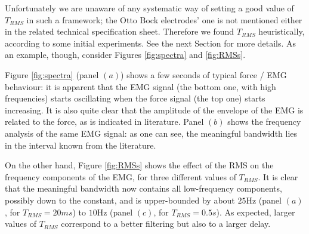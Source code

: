 \documentclass[10pt]{bmc_article}
\newenvironment{bmcformat}{\begin{raggedright}\baselineskip20pt\sloppy\setboolean{publ}{false}}{\end{raggedright}\baselineskip20pt\sloppy}
\begin{document}
\begin{bmcformat}


Unfortunately we are unaware of any systematic way of setting a good
value of $T_{RMS}$ in such a framework; the Otto Bock electrodes' one
is not mentioned either in the related technical specification
sheet. Therefore we found $T_{RMS}$ heuristically, according to some
initial experiments. See the next Section for more details. As an
example, though, consider Figures \ref{fig:spectra} and
\ref{fig:RMSs}.

Figure \ref{fig:spectra} (panel $(a)$) shows a few seconds of typical
force / EMG behaviour: it is apparent that the EMG signal (the bottom
one, with high frequencies) starts oscillating when the force signal
(the top one) starts increasing. It is also quite clear that the
amplitude of the envelope of the EMG is related to the force, as is
indicated in literature. Panel $(b)$ shows the frequency analysis of
the same EMG signal: as one can see, the meaningful bandwidth lies in
the interval known from the literature.

On the other hand, Figure \ref{fig:RMSs} shows the effect of the RMS
on the frequency components of the EMG, for three different values of
$T_{RMS}$. It is clear that the meaningful bandwidth now contains all
low-frequency components, possibly down to the constant, and is
upper-bounded by about $25$Hz (panel $(a)$, for $T_{RMS}=20ms$) to
$10$Hz (panel $(c)$, for $T_{RMS}=0.5s$). As expected, larger values
of $T_{RMS}$ correspond to a better filtering but also to a larger
delay.


\end{bmcformat}
\end{document}

